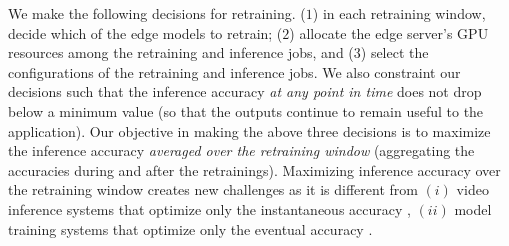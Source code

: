 
We make the following decisions for retraining. %
($1$) in each retraining window, decide which of the edge models to retrain;  
($2$) allocate the edge server's GPU resources among the retraining and inference jobs, and 
($3$) select the configurations of the retraining and inference jobs. %
We also constraint our decisions such that the inference accuracy {\em at any point in time} does not drop below a minimum value (so that the outputs continue to remain useful to the application). 
Our objective in making the above three decisions is to maximize the inference accuracy {\em averaged over the retraining window} (aggregating the accuracies during and after the retrainings). %
Maximizing inference accuracy over the retraining window creates new challenges as it is different from $(i)$ video inference systems that optimize only the instantaneous accuracy \cite{videostorm, noscope, chameleon}, $(ii)$  model training systems that optimize only the eventual accuracy \cite{hyperparameter-16, DBLP:journals/jmlr/BergstraB12, DBLP:conf/nips/SnoekLA12, Swersky_scalablebayesian, DBLP:conf/osdi/XiaoBRSKHPPZZYZ18, DBLP:conf/eurosys/PengBCWG18}.%

